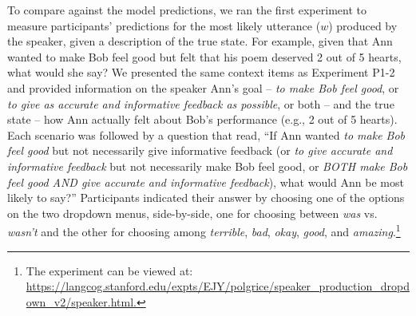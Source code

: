 To compare against the model predictions, we ran the first experiment to measure participants'
predictions for the most likely utterance (\(w\)) produced by the
speaker, given a description of the true state. For example, given that
Ann wanted to make Bob feel good but felt that his poem deserved 2 out
of 5 hearts, what would she say? 
We presented the same context items as Experiment P1-2 and provided information on the speaker Ann's goal -- \emph{to make Bob feel good},
or \emph{to give as accurate and informative feedback as possible}, or
both -- and the true state -- how Ann actually felt about Bob's
performance (e.g., 2 out of 5 hearts). 
Each scenario was followed by a question that read, ``If Ann wanted
\emph{to make Bob feel good} but not necessarily give informative
feedback (or \emph{to give accurate and informative feedback} but not
necessarily make Bob feel good, or \emph{BOTH make Bob feel good AND
give accurate and informative feedback}), what would Ann be most likely
to say?'' Participants indicated their answer by choosing one of the
options on the two dropdown menus, side-by-side, one for choosing
between \emph{was} vs. \emph{wasn't} and the other for choosing among
\emph{terrible}, \emph{bad}, \emph{okay}, \emph{good}, and
\emph{amazing}.\footnote{The experiment can be viewed at: \url{https://langcog.stanford.edu/expts/EJY/polgrice/speaker_production_dropdown_v2/speaker.html.}}
%
%
%




